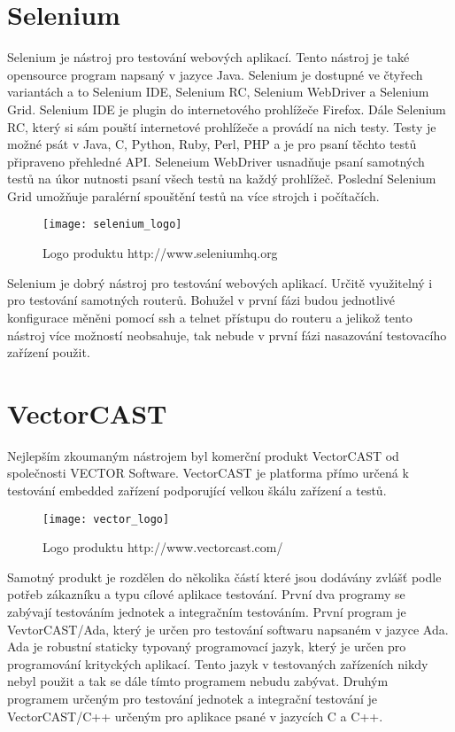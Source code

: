 \section{Selenium}
Selenium je nástroj pro testování webových aplikací. Tento nástroj je také opensource program napsaný v jazyce Java. Selenium je dostupné ve čtyřech variantách a to Selenium IDE, Selenium RC, Selenium WebDriver a Selenium Grid. Selenium IDE je plugin do internetového prohlížeče Firefox. Dále Selenium RC, který si sám pouští internetové prohlížeče a provádí na nich testy. Testy je možné psát v Java, C, Python, Ruby, Perl, PHP a je pro psaní těchto testů připraveno přehledné API. Seleneium WebDriver usnadňuje psaní samotných testů na úkor nutnosti psaní všech testů na každý prohlížeč. Poslední Selenium Grid umožňuje paralérní spouštění testů na více strojch i počítačích.

\begin{figure}[h]
  \centering
  \texttt{[image: selenium\_logo]}
  \caption{Logo produktu http://www.seleniumhq.org}
  \label{fig:selenium_logo}
\end{figure}

Selenium je dobrý nástroj pro testování webových aplikací. Určitě využitelný i pro testování samotných routerů. Bohužel v první fázi budou jednotlivé konfigurace měněni pomocí ssh a telnet přístupu do routeru a jelikož tento nástroj více možností neobsahuje, tak nebude v první fázi nasazování testovacího zařízení použit.

\section{VectorCAST}
Nejlepším zkoumaným nástrojem byl komerční produkt VectorCAST od společnosti VECTOR Software. VectorCAST je platforma přímo určená k testování embedded zařízení podporující velkou škálu zařízení a testů.

\begin{figure}[h]
  \centering
  \texttt{[image: vector\_logo]}
  \caption{Logo produktu http://www.vectorcast.com/}
  \label{fig:vector_logo}
\end{figure}

Samotný produkt je rozdělen do několika částí které jsou dodávány zvlášť podle potřeb zákazníku a typu cílové aplikace testování. První dva programy se zabývají testováním jednotek a integračním testováním. První program je VevtorCAST/Ada, který je určen pro testování softwaru napsaném v jazyce Ada. Ada je robustní staticky typovaný programovací jazyk, který je určen pro programování krityckých aplikací. Tento jazyk v testovaných zařízeních nikdy nebyl použit a tak se dále tímto programem nebudu zabývat. Druhým programem určeným pro testování jednotek a integrační testování je VectorCAST/C++ určeným pro aplikace psané v jazycích C a C++.

